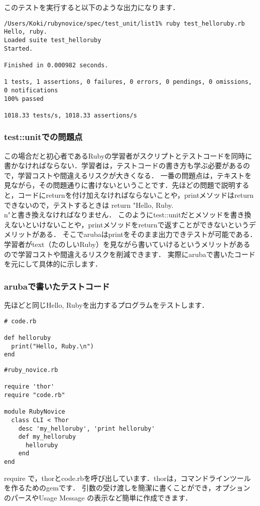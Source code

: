 このテストを実行すると以下のような出力になります．
\begin{lstlisting}[style=customRuby,basicstyle={\scriptsize\ttfamily}]
/Users/Koki/rubynovice/spec/test_unit/list1% ruby test_helloruby.rb 
Hello, ruby.
Loaded suite test_helloruby
Started.

Finished in 0.000982 seconds.

1 tests, 1 assertions, 0 failures, 0 errors, 0 pendings, 0 omissions, 0 notifications
100% passed

1018.33 tests/s, 1018.33 assertions/s
\end{lstlisting}
\subsubsection{test::unitでの問題点}
この場合だと初心者であるRubyの学習者がスクリプトとテストコードを同時に書かなければならない．学習者は，テストコードの書き方も学ぶ必要があるので，学習コストや間違えるリスクが大きくなる．
一番の問題点は，テキストを見ながら，その問題通りに書けないということです．先ほどの問題で説明すると，コードにreturnを付け加えなければならないことや，printメソッドはreturnできないので，テストするときは return "Hello, Ruby.\\n"と書き換えなければなりません．
このようにtest::unitだとメソッドを書き換えないといけないことや，printメソッドをreturnで返すことができないというデメリットがある．
そこでarubaはprintをそのまま出力できテストが可能である．学習者がtext（たのしいRuby）を見ながら書いていけるというメリットがあるので学習コストや間違えるリスクを削減できます．
実際にarubaで書いたコードを元にして具体的に示します．

\subsubsection{arubaで書いたテストコード}
先ほどと同じHello, Rubyを出力するプログラムをテストします．
\begin{lstlisting}[style=customRuby,basicstyle={\scriptsize\ttfamily}]
# code.rb

def helloruby    
  print("Hello, Ruby.\n")
end
\end{lstlisting}\begin{lstlisting}[style=customRuby,basicstyle={\scriptsize\ttfamily}]
#ruby_novice.rb

require 'thor'                                                                         
require "code.rb"

module RubyNovice
  class CLI < Thor
    desc 'my_helloruby', 'print helloruby'
    def my_helloruby
      helloruby
    end
end
\end{lstlisting}
require で，thorとcode.rbを呼び出しています．thorは，コマンドラインツールを作るためのgemです．
引数の受け渡しを簡潔に書くことができ，オプションのパースやUsage Message の表示など簡単に作成できます．

